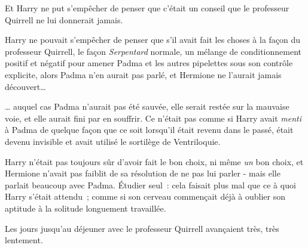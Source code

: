 Et Harry ne put s'empêcher de penser que c'était un conseil que le professeur Quirrell ne lui donnerait jamais.

Harry ne pouvait s'empêcher de penser que s'il avait fait les choses à la façon du professeur Quirrell, le façon \emph{Serpentard} normale, un mélange de conditionnement positif et négatif pour amener Padma et les autres pipelettes sous son contrôle explicite, alors Padma n'en aurait pas parlé, et Hermione ne l'aurait jamais découvert…

… auquel cas Padma n'aurait pas été sauvée, elle serait restée sur la mauvaise voie, et elle aurait fini par en souffrir. Ce n'était pas comme si Harry avait \emph{menti} à Padma de quelque façon que ce soit lorsqu'il était revenu dans le passé, était devenu invisible et avait utilisé le sortilège de Ventriloquie.

Harry n'était pas toujours sûr d'avoir fait le bon choix, ni même \emph{un} bon choix, et Hermione n'avait pas faiblit de sa résolution de ne pas lui parler - mais elle parlait beaucoup avec Padma. Étudier seul~: cela faisait plus mal que ce à quoi Harry s'était attendu~; comme si son cerveau commençait déjà à oublier son aptitude à la solitude longuement travaillée.

Les jours jusqu'au déjeuner avec le professeur Quirrell avançaient très, très lentement. 

